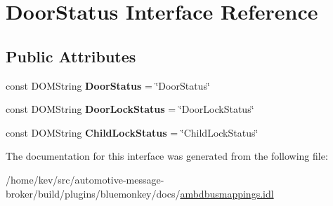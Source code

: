 \hypertarget{interfaceDoorStatus}{\section{Door\+Status Interface Reference}
\label{interfaceDoorStatus}
}
\subsection*{Public Attributes}
\begin{DoxyCompactItemize}
\item 
\hypertarget{interfaceDoorStatus_ab8977ee56597373293c07dd5afac475d}{const D\+O\+M\+String {\bfseries Door\+Status} = \char`\"{}Door\+Status\char`\"{}}\label{interfaceDoorStatus_ab8977ee56597373293c07dd5afac475d}

\item 
\hypertarget{interfaceDoorStatus_a247ed5ad35c7921041979a3720e54189}{const D\+O\+M\+String {\bfseries Door\+Lock\+Status} = \char`\"{}Door\+Lock\+Status\char`\"{}}\label{interfaceDoorStatus_a247ed5ad35c7921041979a3720e54189}

\item 
\hypertarget{interfaceDoorStatus_a1f26de9c8b47568fc38fc219db74883b}{const D\+O\+M\+String {\bfseries Child\+Lock\+Status} = \char`\"{}Child\+Lock\+Status\char`\"{}}\label{interfaceDoorStatus_a1f26de9c8b47568fc38fc219db74883b}

\end{DoxyCompactItemize}


The documentation for this interface was generated from the following file\+:\begin{DoxyCompactItemize}
\item 
/home/kev/src/automotive-\/message-\/broker/build/plugins/bluemonkey/docs/\hyperlink{ambdbusmappings_8idl}{ambdbusmappings.\+idl}\end{DoxyCompactItemize}
